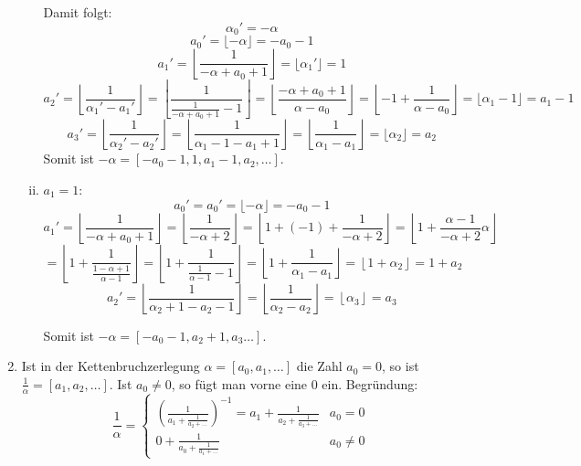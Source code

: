 \begin{enumerate}[(1)]
\begin{enumerate}[(i)]
		Damit folgt:
		\[ \alpha_0' = -\alpha \]
		\[ a_0' = \lfloor -\alpha \rfloor = -a_0 - 1   \]
		\[ a_1' = \left\lfloor \frac{1}{-\alpha + a_0 + 1} \right\rfloor = \lfloor \alpha_1' \rfloor = 1 \]
		\[ a_2' = \left\lfloor \frac{1}{\alpha_1' - a_1' } \right\rfloor 
			= \left\lfloor \frac{1}{\frac{1}{-\alpha + a_0 + 1} - 1} \right\rfloor
			= \left\lfloor \frac{-\alpha + a_0 + 1}{\alpha - a_0} \right\rfloor 
			= \left\lfloor -1 + \frac{1}{\alpha - a_0 } \right\rfloor
			= \lfloor \alpha_1 - 1 \rfloor = a_1 - 1 \]
		\[ a_3' = \left\lfloor \frac{1}{\alpha_2' - a_2' } \right\rfloor
			= \left\lfloor \frac{1}{\alpha_1 - 1 - a_1 + 1} \right\rfloor
			= \left\lfloor \frac{1}{\alpha_1 - a_1} \right\rfloor
			= \lfloor \alpha_2 \rfloor 
			= a_2 \]
		Somit ist $-\alpha = [-a_0 - 1, 1, a_1 - 1, a_2, \ldots ]$.
		\item $a_1 = 1 $:
		\[ a_0' = a_0' = \lfloor -\alpha \rfloor = -a_0 - 1   \]
		\[ a_1' = \left\lfloor \frac{1}{-\alpha + a_0 + 1} \right\rfloor 
			= \left\lfloor \frac{1}{-\alpha + 2} \right\rfloor
			= \left\lfloor 1 + (-1) + \frac{1}{-\alpha + 2} \right\rfloor
			= \left\lfloor 1 +  \frac{\alpha - 1}{-\alpha + 2} \alpha\right\rfloor \]
		\[	= \left\lfloor 1 + \frac{1}{\frac{1-\alpha + 1}{\alpha - 1}} \right\rfloor
			= \left\lfloor 1 + \frac{1}{\frac{1}{\alpha - 1} - 1} \right\rfloor
			= \left\lfloor 1 + \frac{1}{\alpha_1 - a_1} \right\rfloor
			= \left\lfloor 1 + \alpha_2\right\rfloor
			= 1 + a_2 \]
		\[ a_2' = \left\lfloor \frac{1}{\alpha_2 + 1 - a_2 - 1} \right\rfloor
			= \left\lfloor \frac{1}{\alpha_2 - a_2} \right\rfloor
			= \left\lfloor \alpha_3 \right\rfloor
			= a_3 \]
		
		Somit ist $-\alpha = [-a_0 - 1, a_2 + 1, a_3 \ldots ]$.
	\end{enumerate}
	\item Ist in der Kettenbruchzerlegung $\alpha = [a_0, a_1, \dots]$ die
		Zahl $a_0 = 0$, so ist $\frac{1}{\alpha} = [a_1, a_2, \dots]$.
		Ist $a_0 \not= 0$, so fügt man vorne eine $0$ ein. Begründung:
		\[ \frac{1}{\alpha} = 
			\begin{cases}
				\left(\frac{1}{a_1+\frac{1}{a_2+\dots}}\right)^{-1} =
				a_1 + \frac{1}{a_2+\frac{1}{a_3+\dots}} &a_0 = 0 \\
				0 + \frac{1}{a_0+\frac{1}{a_1+\dots}} &a_0 \not= 0
			\end{cases}
				\]
\end{enumerate}


